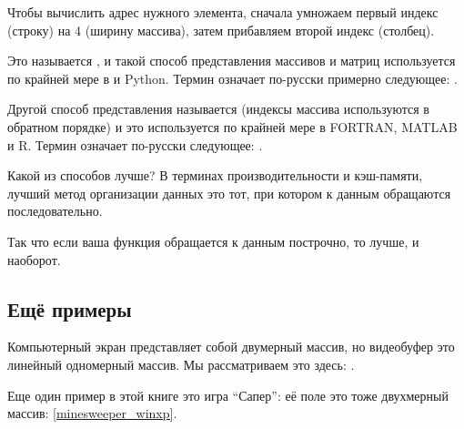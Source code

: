 Чтобы вычислить адрес нужного элемента, сначала умножаем первый индекс (строку) на 4 (ширину массива), 
затем прибавляем второй индекс (столбец).

Это называется , 
и такой способ представления массивов и матриц используется по крайней мере в \CCpp и Python. 
Термин  означает по-русски примерно следующее: .

Другой способ представления называется  (индексы массива используются в обратном порядке) 
и это используется по крайней мере в FORTRAN, MATLAB и R. 
Термин  означает по-русски
следующее: .

Какой из способов лучше?
В терминах производительности и кэш-памяти, лучший метод организации данных это тот,
при котором к данным обращаются последовательно.

Так что если ваша функция обращается к данным построчно, то  лучше,
и наоборот.





\subsection{Ещё примеры}

Компьютерный экран представляет собой двумерный массив, но видеобуфер это линейный
одномерный массив. 
Мы рассматриваем это здесь: .

Еще один пример в этой книге это игра ``Сапер'': её поле это тоже двухмерный массив: \ref{minesweeper_winxp}.


